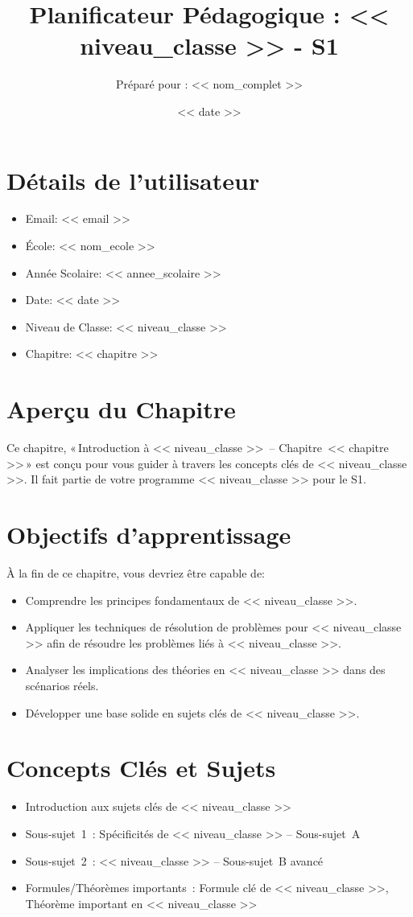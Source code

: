 \documentclass{article}
\title{Planificateur Pédagogique : << niveau_classe >> - S1}
\author{Préparé pour : << nom_complet >>}
\date{<< date >>}
\begin{document}
	
	\maketitle
	
	\section*{Détails de l'utilisateur}
	\begin{itemize}
		\item Email: << email >>
		\item École: << nom_ecole >>
		\item Année Scolaire: << annee_scolaire >>
		\item Date: << date >>
		\item Niveau de Classe: << niveau_classe >>
		\item Chapitre: << chapitre >>
	\end{itemize}
	
	\section*{Aperçu du Chapitre}
	Ce chapitre, « Introduction à << niveau_classe >> – Chapitre << chapitre >> »  
	est conçu pour vous guider à travers les concepts clés de << niveau_classe >>.  
	Il fait partie de votre programme << niveau_classe >> pour le S1.
	
	\section*{Objectifs d'apprentissage}
	À la fin de ce chapitre, vous devriez être capable de:
	\begin{itemize}
		\item Comprendre les principes fondamentaux de << niveau_classe >>.
		\item Appliquer les techniques de résolution de problèmes pour << niveau_classe >> afin de résoudre les problèmes liés à << niveau_classe >>.
		\item Analyser les implications des théories en << niveau_classe >> dans des scénarios réels.
		\item Développer une base solide en sujets clés de << niveau_classe >>.
	\end{itemize}
	
	\section*{Concepts Clés et Sujets}
	\begin{itemize}
		\item Introduction aux sujets clés de << niveau_classe >>
		\item Sous-sujet 1 : Spécificités de << niveau_classe >> – Sous-sujet A
		\item Sous-sujet 2 : << niveau_classe >> – Sous-sujet B avancé
		\item Formules/Théorèmes importants : Formule clé de << niveau_classe >>, Théorème important en << niveau_classe >>
	\end{itemize}
	
\end{document}
